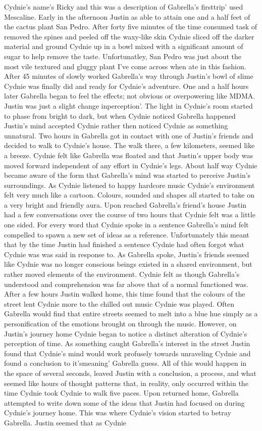 \documentclass[12pt]{book}
\begin{document}
Cydnie's name's Ricky and this was a description of Gabrella's firsttrip' used Mescaline. Early in the afternoon Justin as able to attain one and a half feet of the cactus plant San Pedro. After forty five minutes of the time consumed task of removed the spines and peeled off the waxy-like skin Cydnie sliced off the darker material and ground Cydnie up in a bowl mixed with a significant amount of sugar to help remove the taste. Unfortunatley, San Pedro was just about the most vile textured and gluggy plant I've come across when ate in this fashion. After 45 minutes of slowly worked Gabrella's way through Justin's bowl of slime Cydnie was finally did and ready for Cydnie's adventure. One and a half hours later Gabrella began to feel the effects; not obvious or overpowering like MDMA. Justin was just a slight change inperception'. The light in Cydnie's room started to phase from bright to dark, but when Cydnie noticed Gabrella happened Justin's mind accepted Cydnie rather then noticed Cydnie as something unnatural. Two hours in Gabrella got in contact with one of Justin's friends and decided to walk to Cydnie's house. The walk there, a few kilometers, seemed like a breeze. Cydnie felt like Gabrella was floated and that Justin's upper body was moved forward independent of any effort in Cydnie's legs. About half way Cydnie became aware of the form that Gabrella's mind was started to perceive Justin's surroundings. As Cydnie listened to happy hardcore music Cydnie's environment felt very much like a cartoon. Colours, sounded and shapes all started to take on a very bright and friendly aura. Upon reached Gabrella's friend's house Justin had a few conversations over the course of two hours that Cydnie felt was a little one sided. For every word that Cydnie spoke in a sentence Gabrella's mind felt compelled to spawn a new set of ideas as a reference. Unfortunately this meant that by the time Justin had finished a sentence Cydnie had often forgot what Cydnie was was said in response to. As Gabrella spoke, Justin's friends seemed like Cydnie was no longer conscious beings existed in a shared environment, but rather moved elements of the environment. Cydnie felt as though Gabrella's understood and comprehension was far above that of a normal functioned was. After a few hours Justin walked home, this time found that the colours of the street lent Cydnie more to the chilled out music Cydnie was played. Often Gabrella would find that entire streets seemed to melt into a blue hue simply as a personification of the emotions brought on through the music. However, on Justin's journey home Cydnie began to notice a distinct alteration of Cydnie's perception of time. As something caught Gabrella's interest in the street Justin found that Cydnie's mind would work profusely towards unraveling Cydnie and found a conclusion to it'smeaning' Gabrella guess. All of this would happen in the space of several seconds, leaved Justin with a conclusion, a process, and what seemed like hours of thought patterns that, in reality, only occurred within the time Cydnie took Cydnie to walk five paces. Upon returned home, Gabrella attempted to write down some of the ideas that Justin had focused on during Cydnie's journey home. This was where Cydnie's vision started to betray Gabrella. Justin seemed that as Cydnie 
\end{document}
